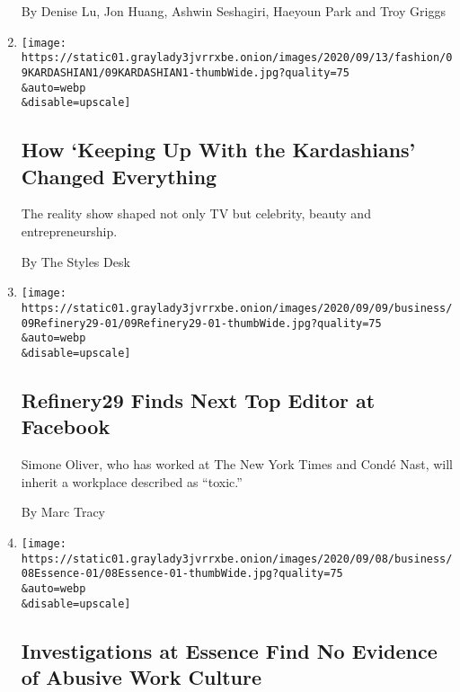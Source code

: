 \begin{enumerate}
  By Denise Lu, Jon Huang, Ashwin Seshagiri, Haeyoun Park and Troy
  Griggs
\item
  \href{/2020/09/09/style/kardashians-ending-takeaways.html}{}

  \texttt{[image: https://static01.graylady3jvrrxbe.onion/images/2020/09/13/fashion/09KARDASHIAN1/09KARDASHIAN1-thumbWide.jpg?quality=75\\\&auto=webp\\\&disable=upscale]}

  \hypertarget{how-keeping-up-with-the-kardashians-changed-everything}{%
  \subsection{How `Keeping Up With the Kardashians' Changed
  Everything}\label{how-keeping-up-with-the-kardashians-changed-everything}}

  The reality show shaped not only TV but celebrity, beauty and
  entrepreneurship.

  By The Styles Desk
\item
  \href{/2020/09/09/business/media/vice-media-refinery29-editor.html}{}

  \texttt{[image: https://static01.graylady3jvrrxbe.onion/images/2020/09/09/business/09Refinery29-01/09Refinery29-01-thumbWide.jpg?quality=75\\\&auto=webp\\\&disable=upscale]}

  \hypertarget{refinery29-finds-next-top-editor-at-facebook}{%
  \subsection{Refinery29 Finds Next Top Editor at
  Facebook}\label{refinery29-finds-next-top-editor-at-facebook}}

  Simone Oliver, who has worked at The New York Times and Condé Nast,
  will inherit a workplace described as ``toxic.''

  By Marc Tracy
\item
  \href{/2020/09/08/business/media/essence-magazine-harassment-investigations.html}{}

  \texttt{[image: https://static01.graylady3jvrrxbe.onion/images/2020/09/08/business/08Essence-01/08Essence-01-thumbWide.jpg?quality=75\\\&auto=webp\\\&disable=upscale]}

  \hypertarget{investigations-at-essence-find-no-evidence-of-abusive-work-culture}{%
  \subsection{Investigations at Essence Find No Evidence of Abusive Work
  Culture}\label{investigations-at-essence-find-no-evidence-of-abusive-work-culture}}


\end{enumerate}
